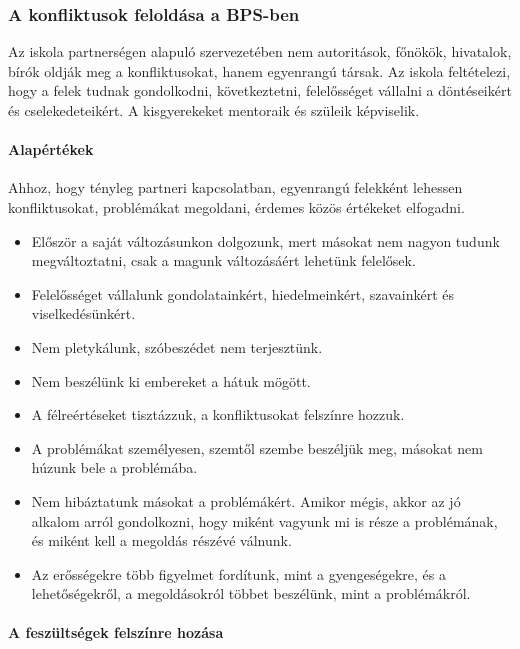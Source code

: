 \hypertarget{a-bps-konfliktusok-feloldasa}{%
\subsubsection{A konfliktusok feloldása a BPS-ben}\label{a-bps-konfliktusok-feloldasa}}

Az iskola partnerségen alapuló szervezetében nem autoritások, főnökök,
hivatalok, bírók oldják meg a konfliktusokat, hanem egyenrangú társak.
Az iskola feltételezi, hogy a felek tudnak gondolkodni, következtetni,
felelősséget vállalni a döntéseikért és cselekedeteikért. A kisgyerekeket
mentoraik és szüleik képviselik.

\hypertarget{alapertekek}{%
\paragraph{Alapértékek}\label{alapertekek}}

Ahhoz, hogy tényleg partneri kapcsolatban, egyenrangú\break
felekként lehessen
konfliktusokat, problémákat megoldani, érdemes közös értékeket
elfogadni.

\begin{itemize}
\item
  Először a saját változásunkon dolgozunk, mert másokat nem nagyon tudunk
  megváltoztatni, csak a magunk változásáért lehetünk felelősek.
\item
  Felelősséget vállalunk gondolatainkért, hiedelmeinkért, szavainkért
  és viselkedésünkért.
\item
  Nem pletykálunk, szóbeszédet nem terjesztünk.
\item
  Nem beszélünk ki embereket a hátuk mögött.
\item
  A félreértéseket tisztázzuk, a konfliktusokat felszínre hozzuk.
\item
  A problémákat személyesen, szemtől szembe beszéljük meg, másokat nem
  húzunk bele a problémába.
\item
  Nem hibáztatunk másokat a problémákért. Amikor mégis, akkor az
  jó alkalom arról gondolkozni, hogy miként vagyunk mi is része a
  problémának, és miként kell a megoldás részévé válnunk.
\item
  Az erősségekre több figyelmet fordítunk, mint a gyengeségekre, és a
  lehetőségekről, a megoldásokról többet beszélünk, mint a problémákról.
\end{itemize}

\hypertarget{feszultseg-felszinre-hozasa}{%
\paragraph{A feszültségek felszínre
hozása}\label{feszultseg-felszinre-hozasa}}

